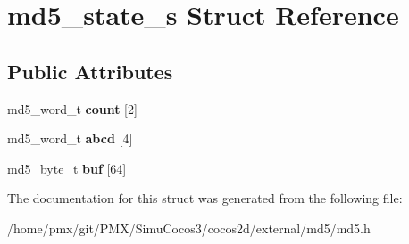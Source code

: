 \hypertarget{structmd5__state__s}{}\section{md5\+\_\+state\+\_\+s Struct Reference}
\label{structmd5__state__s}
\subsection*{Public Attributes}
\begin{DoxyCompactItemize}
\item 
\mbox{\label{structmd5__state__s_ad0b84a513af432acf997597f59b475a3}} 
md5\+\_\+word\+\_\+t {\bfseries count} \mbox{[}2\mbox{]}
\item 
\mbox{\label{structmd5__state__s_ac7aead0e98fbd09a0f84b9087284064c}} 
md5\+\_\+word\+\_\+t {\bfseries abcd} \mbox{[}4\mbox{]}
\item 
\mbox{\label{structmd5__state__s_a71ce7456c47cdb9ba243608dbe6ec7f4}} 
md5\+\_\+byte\+\_\+t {\bfseries buf} \mbox{[}64\mbox{]}
\end{DoxyCompactItemize}


The documentation for this struct was generated from the following file\+:\begin{DoxyCompactItemize}
\item 
/home/pmx/git/\+P\+M\+X/\+Simu\+Cocos3/cocos2d/external/md5/md5.\+h\end{DoxyCompactItemize}
